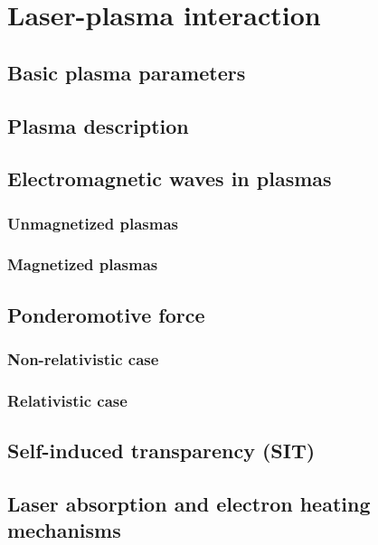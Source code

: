 \documentclass[12pt, twoside, a4paper, openright]{report}
\begin{document}
\chapter{Laser-plasma interaction}


\section{Basic plasma parameters}


\section{Plasma description}


\section{Electromagnetic waves in plasmas}


\subsection{Unmagnetized plasmas}


\subsection{Magnetized plasmas}


\section{Ponderomotive force}


\subsection{Non-relativistic case}


\subsection{Relativistic case}


\section{Self-induced transparency (SIT)}


\section{Laser absorption and electron heating mechanisms}

\end{document}
